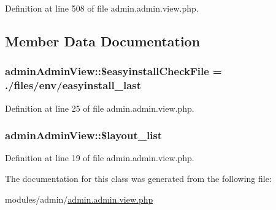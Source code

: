 Definition at line 508 of file admin.\+admin.\+view.\+php.



\subsection{Member Data Documentation}
\hypertarget{classadminAdminView_a3cfff18fed688e8cf67f4f8bbba79abf}{}
\subsubsection[{\$easyinstall\+Check\+File}]{\setlength{\rightskip}{0pt plus 5cm}admin\+Admin\+View\+::\$easyinstall\+Check\+File = \textquotesingle{}./files/env/easyinstall\+\_\+last\textquotesingle{}}\label{classadminAdminView_a3cfff18fed688e8cf67f4f8bbba79abf}


Definition at line 25 of file admin.\+admin.\+view.\+php.

\hypertarget{classadminAdminView_a3655428ad4a88938daaa0a44c1ff96ea}{}
\subsubsection[{\$layout\+\_\+list}]{\setlength{\rightskip}{0pt plus 5cm}admin\+Admin\+View\+::\$layout\+\_\+list}\label{classadminAdminView_a3655428ad4a88938daaa0a44c1ff96ea}


Definition at line 19 of file admin.\+admin.\+view.\+php.



The documentation for this class was generated from the following file\+:\begin{DoxyCompactItemize}
\item 
modules/admin/\hyperlink{admin_8admin_8view_8php}{admin.\+admin.\+view.\+php}\end{DoxyCompactItemize}
